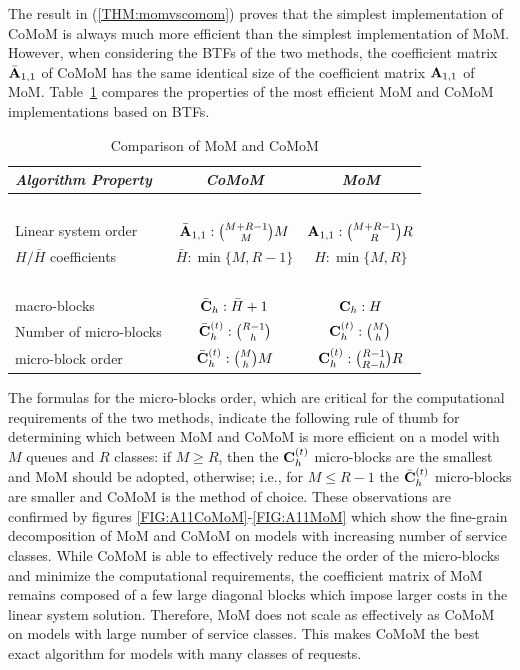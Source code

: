 \documentclass[journal,twocolumn,9.5pt]{IEEEtran}
\newcommand{\comom}[1]{\bar{#1}}
\begin{document}
The result in (\ref{THM:momvscomom}) proves that the simplest implementation of CoMoM is always much more efficient than the simplest implementation of MoM. However, when considering the BTFs of the two methods, the coefficient matrix $\comom{\bf A}_{1,1}$ of CoMoM has the same identical size of the coefficient matrix ${\bf A}_{1,1}$ of MoM. Table~\ref{TAB:momvscomom} compares the properties of the most efficient MoM and CoMoM implementations based on BTFs.
\begin{table}[h]
\renewcommand{\arraystretch}{1.05}
\centering
\caption{Comparison of MoM and CoMoM}
\begin{tabular}{|l|c|c|}
\hline
{\em Algorithm Property} & {\em CoMoM} & {\em MoM} \\
\hline
~& & \\[-7pt]
Linear system order & $\textstyle \comom{\bf A}_{1,1}: {M+R-1 \choose M}M$ & $\textstyle {\bf A}_{1,1}: {M+R-1 \choose R}R$ \\
\hline
$H/\comom{H}$ coefficients & $\textstyle \comom{H}: \min\{M,R-1\}$ & $\displaystyle {H}: \min\{M,R\}$ \\
\hline
~& & \\[-5pt]
macro-blocks & $\textstyle \comom{\bf C}_{h}: \comom{H}+1$ & $\textstyle {\bf C}_{h}: {H}$ \\
\hline
Number of micro-blocks & $\textstyle \comom{\bf C}^{(t)}_{h}: {R-1 \choose h}$ & $\textstyle {\bf C}^{(t)}_{h}: {M \choose h}$ \\
\hline
micro-block order & $\textstyle  \comom{\bf C}^{(t)}_{h}:{M \choose h}M$ & $\textstyle {\bf C}^{(t)}_{h}: {R-1 \choose R-h}R$ \\
\hline
\end{tabular}
\label{TAB:momvscomom}
\end{table}
 The formulas for the micro-blocks order, which are critical for the computational requirements of the two methods, indicate the following rule of thumb for determining which between MoM and CoMoM is more efficient on a model with $M$ queues and $R$ classes:
if $M\geq  R$, then the ${\bf C}^{(t)}_{h}$ micro-blocks are the smallest and MoM should be adopted, otherwise; i.e., for $M\leq R-1$ the $\comom{\bf C}^{(t)}_{h}$ micro-blocks are smaller and CoMoM is the method of choice. These observations are confirmed by figures \ref{FIG:A11CoMoM}-\ref{FIG:A11MoM} which show the fine-grain decomposition of MoM and CoMoM on models with increasing number of service classes. While CoMoM is able to effectively reduce the order of the micro-blocks and minimize the computational requirements, the coefficient matrix of MoM remains composed of a few large diagonal blocks which impose larger costs in the linear system solution. Therefore, MoM does not scale as effectively as CoMoM on models with large number of service classes. This makes CoMoM the best exact algorithm for models with many classes of requests.
\end{document}
